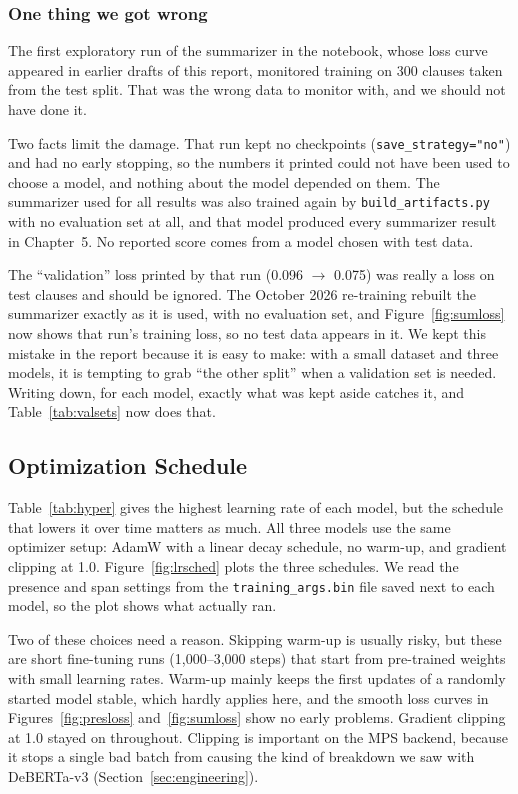 \subsubsection{One thing we got wrong}
The first exploratory run of the summarizer in the notebook, whose loss curve appeared in earlier drafts of this report, monitored training on 300 clauses taken from the test split. That was the wrong data to monitor with, and we should not have done it.

Two facts limit the damage. That run kept no checkpoints (\texttt{save\_strategy="no"}) and had no early stopping, so the numbers it printed could not have been used to choose a model, and nothing about the model depended on them. The summarizer used for all results was also trained again by \texttt{build\_artifacts.py} with no evaluation set at all, and that model produced every summarizer result in Chapter~5. No reported score comes from a model chosen with test data.

The ``validation'' loss printed by that run (0.096 $\to$ 0.075) was really a loss on test clauses and should be ignored. The October 2026 re-training rebuilt the summarizer exactly as it is used, with no evaluation set, and Figure~\ref{fig:sumloss} now shows that run's training loss, so no test data appears in it. We kept this mistake in the report because it is easy to make: with a small dataset and three models, it is tempting to grab ``the other split'' when a validation set is needed. Writing down, for each model, exactly what was kept aside catches it, and Table~\ref{tab:valsets} now does that.
\subsection{Optimization Schedule}
Table~\ref{tab:hyper} gives the highest learning rate of each model, but the schedule that lowers it over time matters as much. All three models use the same optimizer setup: AdamW with a linear decay schedule, no warm-up, and gradient clipping at 1.0. Figure~\ref{fig:lrsched} plots the three schedules. We read the presence and span settings from the \texttt{training\_args.bin} file saved next to each model, so the plot shows what actually ran.

Two of these choices need a reason. Skipping warm-up is usually risky, but these are short fine-tuning runs (1{,}000--3{,}000 steps) that start from pre-trained weights with small learning rates. Warm-up mainly keeps the first updates of a randomly started model stable, which hardly applies here, and the smooth loss curves in Figures~\ref{fig:presloss} and~\ref{fig:sumloss} show no early problems. Gradient clipping at 1.0 stayed on throughout. Clipping is important on the MPS backend, because it stops a single bad batch from causing the kind of breakdown we saw with DeBERTa-v3 (Section~\ref{sec:engineering}).

